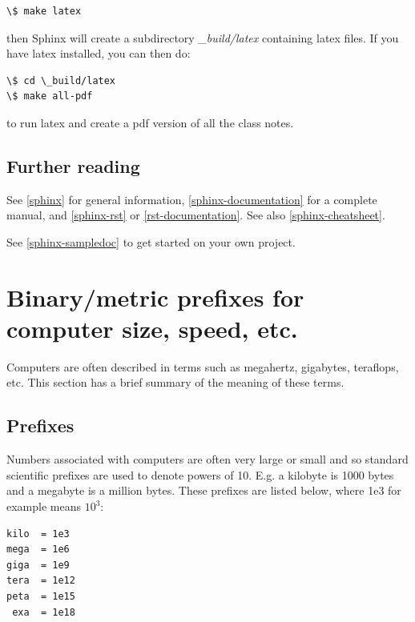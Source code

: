 \documentclass[letterpaper,10pt,english]{sphinxmanual}
\begin{document}
\begin{Verbatim}[commandchars=\\\{\}]
\$ make latex
\end{Verbatim}

then Sphinx will create a subdirectory \emph{\_build/latex} containing latex
files.  If you have latex installed, you can then do:

\begin{Verbatim}[commandchars=\\\{\}]
\$ cd \_build/latex
\$ make all-pdf
\end{Verbatim}

to run latex and create a pdf version of all the class notes.


\subsection{Further reading}
\label{sphinx:further-reading}
See {\hyperref[biblio:sphinx]{{[}sphinx{]}}} for general information, {\hyperref[biblio:sphinx-documentation]{{[}sphinx-documentation{]}}} for a
complete manual, and {\hyperref[biblio:sphinx-rst]{{[}sphinx-rst{]}}} or {\hyperref[biblio:rst-documentation]{{[}rst-documentation{]}}}.
See also {\hyperref[biblio:sphinx-cheatsheet]{{[}sphinx-cheatsheet{]}}}.

See {\hyperref[biblio:sphinx-sampledoc]{{[}sphinx-sampledoc{]}}} to get started on your own project.


\section{Binary/metric prefixes for computer size, speed, etc.}
\label{metrics:metrics}\label{metrics:binary-metric-prefixes-for-computer-size-speed-etc}\label{metrics::doc}
Computers are often described in terms such as megahertz, gigabytes,
teraflops, etc.  This section has a brief summary of the meaning of these
terms.


\subsection{Prefixes}
\label{metrics:prefixes}\label{metrics:id1}
Numbers associated with computers are often very large or small and so
standard scientific prefixes are used to denote powers of 10. E.g. a
kilobyte is 1000 bytes and a megabyte is a million bytes.  These prefixes
are listed below, where 1e3 for example means $10^3$:

\begin{Verbatim}[commandchars=\\\{\}]
kilo  = 1e3
mega  = 1e6
giga  = 1e9
tera  = 1e12
peta  = 1e15
 exa  = 1e18
\end{Verbatim}
\end{document}
